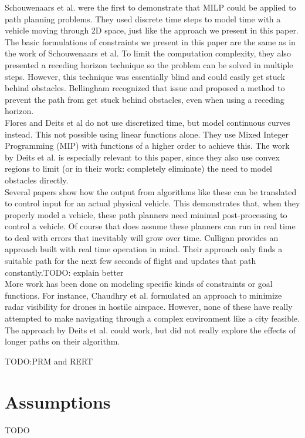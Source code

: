Schouwenaars et al. \cite{Schouwenaars2001} were the first to demonstrate that MILP could be applied to path planning problems. They used discrete time steps to model time with a vehicle moving through 2D space, just like the approach we present in this paper. The basic formulations of constraints we present in this paper are the same as in the work of Schouwenaars et al. To limit the computation complexity, they also presented a receding horizon technique so the problem can be solved in multiple steps. However, this technique was essentially blind and could easily get stuck behind obstacles. Bellingham\cite{Bellingham2002} recognized that issue and proposed a method to prevent the path from get stuck behind obstacles, even when using a receding horizon. \\

Flores\cite{Flores2007} and Deits et al\cite{Deits2015} do not use discretized time, but model continuous curves instead. This not possible using linear functions alone. They use Mixed Integer Programming (MIP) with functions of a higher order to achieve this. The work by Deits et al. is especially relevant to this paper, since they also use convex regions to limit (or in their work: completely eliminate) the need to model obstacles directly. \\

Several papers \cite{Fliess1995a, Hao2005, Cowling2007, Mellinger2011} show how the output from algorithms like these can be translated to control input for an actual physical vehicle. This demonstrates that, when they properly model a vehicle, these path planners need minimal post-processing to control a vehicle. Of course that does assume these planners can run in real time to deal with errors that inevitably will grow over time. Culligan \cite{Culligan2006} provides an approach built with real time operation in mind. Their approach only finds a suitable path for the next few seconds of flight and updates that path constantly.TODO: explain better \\

More work has been done on modeling specific kinds of constraints or goal functions. For instance, Chaudhry et al. \cite{Chaudhry2004} formulated an approach to minimize radar visibility for drones in hostile airspace. However, none of these have really attempted to make navigating through a complex environment like a city feasible. The approach by Deits et al. \cite{Deits2015} could work, but did not really explore the effects of longer paths on their algorithm.

TODO:PRM and RERT \\

\section{Assumptions}
TODO